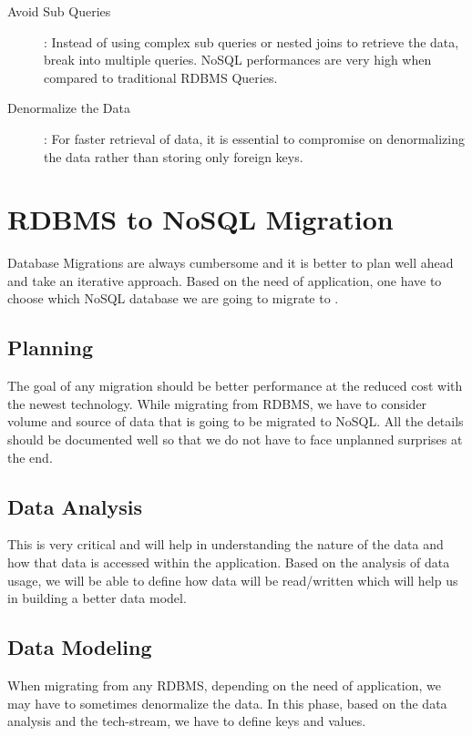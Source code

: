 \documentclass[sigconf]{acmart}
\begin{document}
\begin{description}
    \item[Avoid Sub Queries]: Instead of using complex sub queries or nested joins to retrieve the data, break into multiple queries. NoSQL performances are very high when compared to traditional RDBMS Queries.
    \item[Denormalize the Data]: For faster retrieval of data, it is essential to compromise on denormalizing the data rather than storing only foreign keys.
    
\end{description}

\section{RDBMS to NoSQL Migration}

Database Migrations are always cumbersome and it is better to plan well ahead and take an iterative approach. Based on the need of application, one have to choose which NoSQL database we are going to migrate to  \cite{aws}.

\subsection{Planning}  

The goal of any migration should be better performance at the reduced cost with the newest technology. While migrating from RDBMS, we have to consider volume and source of data that is going to be migrated to NoSQL. All the details should be documented well so that we do not have to face unplanned surprises at the end.

\subsection{Data Analysis} 

This is very critical and will help in understanding the nature of the data and how that data is accessed within the application. Based on the analysis of data usage, we will be able to define how data will be read/written which will help us in building a better data model.

\subsection{Data Modeling} 

When migrating from any RDBMS, depending on the need of application, we may have to sometimes denormalize the data. In this phase, based on the data analysis and the tech-stream, we have to define keys and values.
\end{document}
